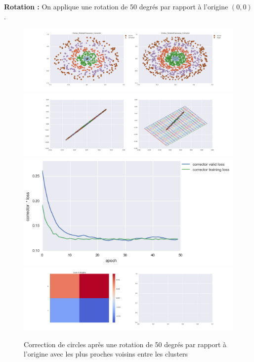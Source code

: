 
{\Large \textbf{Rotation :}} On applique une rotation de 50 degrés par rapport à l'origine $(0,0)$.

\begin{figure}[H] %
\centering
\includegraphics[width=\linewidth]{fig/24-05-2016/circles/Circles_RotatedClasswise_Corrector-DATA.png}
\includegraphics[width=\linewidth]{fig/24-05-2016/circles/Circles_RotatedClasswise_Corrector-GridCheck.png}
\includegraphics[width=0.45\linewidth]{fig/24-05-2016/circles/Circles_RotatedClasswise_Corrector-Learning_curve.png}
\includegraphics[width=\linewidth]{fig/24-05-2016/circles/Circles_RotatedClasswise_Corrector-W.png}
\caption{Correction de circles après une rotation de 50 degrés par rapport à l'origine avec les plus proches voisins entre les clusters}
\label{fig:recap-circles-rot-classwise}
\end{figure}

